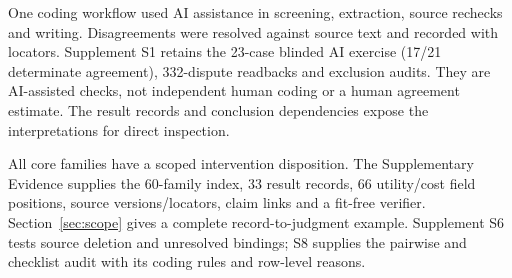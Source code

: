 One coding workflow used AI assistance in screening, extraction, source rechecks and writing. Disagreements were resolved against source text and recorded with locators. Supplement S1 retains the 23-case blinded AI exercise (17/21 determinate agreement), 332-dispute readbacks and exclusion audits. They are AI-assisted checks, not independent human coding or a human agreement estimate. The result records and conclusion dependencies expose the interpretations for direct inspection.

All \FinalCore{} core families have a scoped intervention disposition. The Supplementary Evidence supplies the 60-family index, 33 result records, 66 utility/cost field positions, source versions/locators, claim links and a fit-free verifier. Section~\ref{sec:scope} gives a complete record-to-judgment example. Supplement S6 tests source deletion and unresolved bindings; S8 supplies the pairwise and checklist audit with its coding rules and row-level reasons.
